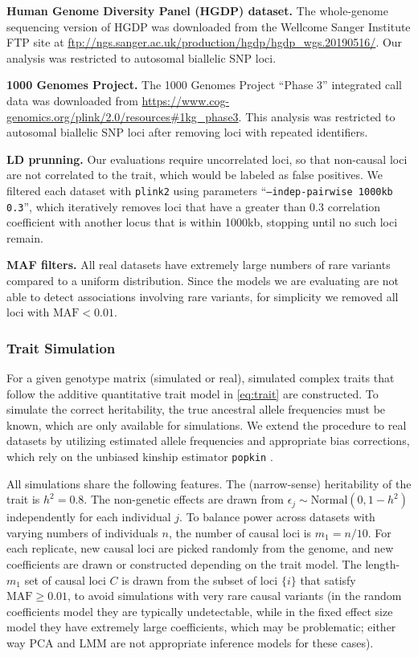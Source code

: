 \documentclass[11pt]{article}
\begin{document}
\textbf{Human Genome Diversity Panel (HGDP) dataset.}
The whole-genome sequencing version of HGDP \citep{bergstrom_insights_2020} was downloaded from the Wellcome Sanger Institute FTP site at \url{ftp://ngs.sanger.ac.uk/production/hgdp/hgdp_wgs.20190516/}.
Our analysis was restricted to autosomal biallelic SNP loci.

\textbf{1000 Genomes Project.}
The 1000 Genomes Project ``Phase 3'' integrated call data \citep{the_1000_genomes_project_consortium_map_2010, 1000_genomes_project_consortium_integrated_2012} was downloaded from \url{https://www.cog-genomics.org/plink/2.0/resources#1kg_phase3}.
This analysis was restricted to autosomal biallelic SNP loci after removing loci with repeated identifiers.

\textbf{LD prunning.}
Our evaluations require uncorrelated loci, so that non-causal loci are not correlated to the trait, which would be labeled as false positives.
We filtered each dataset with \texttt{plink2} using parameters ``\texttt{--indep-pairwise 1000kb 0.3}'', which iteratively removes loci that have a greater than 0.3 correlation coefficient with another locus that is within 1000kb, stopping until no such loci remain.

\textbf{MAF filters.}
All real datasets have extremely large numbers of rare variants compared to a uniform distribution.
Since the models we are evaluating are not able to detect associations involving rare variants, for simplicity we removed all loci with $\text{MAF} < 0.01$.

\subsubsection{Trait Simulation}

For a given genotype matrix (simulated or real), simulated complex traits that follow the additive quantitative trait model in \cref{eq:trait} are constructed.
To simulate the correct heritability, the true ancestral allele frequencies \pit must be known, which are only available for simulations.
We extend the procedure to real datasets by utilizing estimated allele frequencies and appropriate bias corrections, which rely on the unbiased kinship estimator \texttt{popkin} \citep{ochoa_estimating_2021}.

All simulations share the following features.
The (narrow-sense) heritability of the trait is $h^2 = 0.8$.
The non-genetic effects are drawn from $\epsilon_j \sim \text{Normal}(0, 1 - h^2 )$ independently for each individual $j$.
To balance power across datasets with varying numbers of individuals $n$, the number of causal loci is $m_1 = n / 10$.
For each replicate, new causal loci are picked randomly from the genome, and new coefficients are drawn or constructed depending on the trait model.
The length-$m_1$ set of causal loci $C$ is drawn from the subset of loci $\{ i \}$ that satisfy $\text{MAF} \ge 0.01$, to avoid simulations with very rare causal variants (in the random coefficients model they are typically undetectable, while in the fixed effect size model they have extremely large coefficients, which may be problematic; either way PCA and LMM are not appropriate inference models for these cases).
\end{document}
